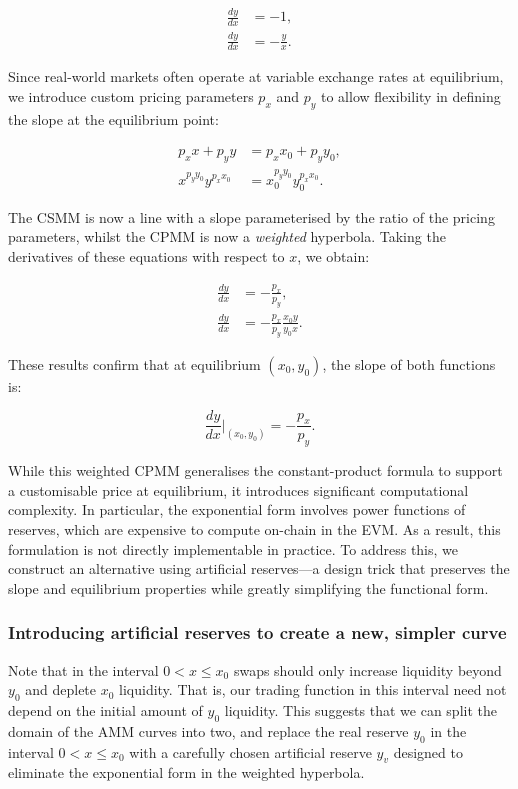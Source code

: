 \documentclass{article}
\begin{document}
\begin{align}
    \frac{dy}{dx} &= -1, \\
    \frac{dy}{dx} &= -\frac{y}{x}.
\end{align}

Since real-world markets often operate at variable exchange rates at equilibrium, we introduce custom pricing parameters $p_x$ and $p_y$ to allow flexibility in defining the slope at the equilibrium point:

\begin{align}
    \label{eq:weighted-line}
    p_x x + p_y y &= p_x x_0 + p_y y_0, \\
    \label{eq:exponential-form}
    x^{p_y y_0} y^{p_x x_0} &= x_0^{p_y y_0} y_0^{p_x x_0}.
\end{align}

The CSMM is now a line with a slope parameterised by the ratio of the pricing parameters, whilst the CPMM is now a \textit{weighted} hyperbola. Taking the derivatives of these equations with respect to $x$, we obtain:

\begin{align}
    \frac{dy}{dx} &= -\frac{p_x}{p_y}, \\
    \frac{dy}{dx} &= -\frac{p_x}{p_y} \frac{x_0 y}{y_0 x}.
\end{align}

These results confirm that at equilibrium $(x_0, y_0)$, the slope of both functions is:

\[
\frac{dy}{dx} \Big|_{(x_0, y_0)} = -\frac{p_x}{p_y}.
\]

While this weighted CPMM generalises the constant-product formula to support a customisable price at equilibrium, it introduces significant computational complexity. In particular, the exponential form involves power functions of reserves, which are expensive to compute on-chain in the EVM. As a result, this formulation is not directly implementable in practice. To address this, we construct an alternative using artificial reserves—a design trick that preserves the slope and equilibrium properties while greatly simplifying the functional form.

\subsubsection{Introducing artificial reserves to create a new, simpler curve}

Note that in the interval $0 < x \leq x_0$ swaps should only increase liquidity beyond $y_0$ and deplete $x_0$ liquidity. That is, our trading function in this interval need not depend on the initial amount of $y_0$ liquidity. This suggests that we can split the domain of the AMM curves into two, and replace the real reserve $y_0$ in the interval $0 < x \leq x_0$ with a carefully chosen artificial reserve $y_v$ designed to eliminate the exponential form in the weighted hyperbola. 
\end{document}
